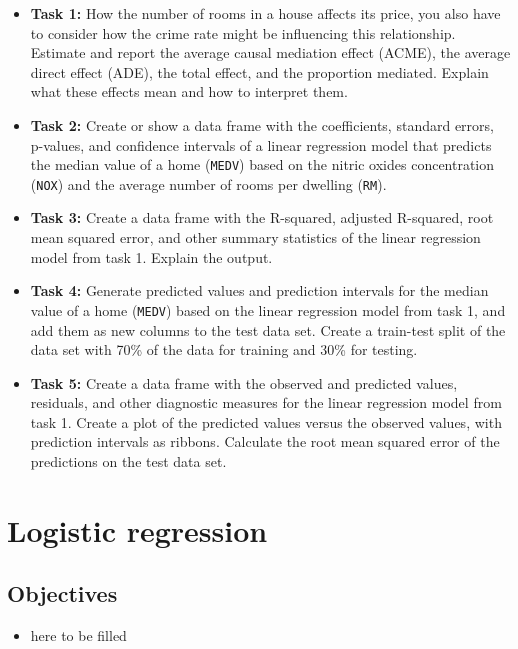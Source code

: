 \documentclass[
]{book}
\providecommand{\tightlist}{%
  \setlength{\itemsep}{0pt}\setlength{\parskip}{0pt}}
\begin{document}
\begin{itemize}
\item
  \textbf{Task 1:} How the number of rooms in a house affects its price, you also have to consider how the crime rate might be influencing this relationship. Estimate and report the average causal mediation effect (ACME), the average direct effect (ADE), the total effect, and the proportion mediated. Explain what these effects mean and how to interpret them.
\item
  \textbf{Task 2:} Create or show a data frame with the coefficients, standard errors, p-values, and confidence intervals of a linear regression model that predicts the median value of a home (\texttt{MEDV}) based on the nitric oxides concentration (\texttt{NOX}) and the average number of rooms per dwelling (\texttt{RM}).
\item
  \textbf{Task 3:} Create a data frame with the R-squared, adjusted R-squared, root mean squared error, and other summary statistics of the linear regression model from task 1. Explain the output.
\item
  \textbf{Task 4:} Generate predicted values and prediction intervals for the median value of a home (\texttt{MEDV}) based on the linear regression model from task 1, and add them as new columns to the test data set. Create a train-test split of the data set with 70\% of the data for training and 30\% for testing.
\item
  \textbf{Task 5:} Create a data frame with the observed and predicted values, residuals, and other diagnostic measures for the linear regression model from task 1. Create a plot of the predicted values versus the observed values, with prediction intervals as ribbons. Calculate the root mean squared error of the predictions on the test data set.
\end{itemize}

\hypertarget{log-est}{%
\chapter{Logistic regression}\label{log-est}}

\hypertarget{objectives-8}{%
\section{Objectives}\label{objectives-8}}

\begin{itemize}
\tightlist
\item
  here to be filled
\end{itemize}
\end{document}
